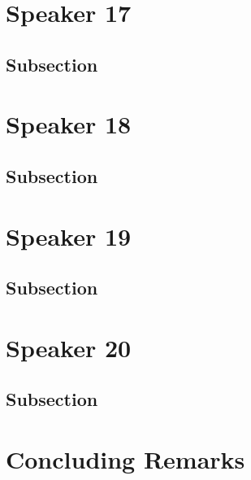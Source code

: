 \documentclass[
]{book}
\begin{document}
\hypertarget{speaker-17}{%
\chapter*{Speaker 17}\label{speaker-17}}

\hypertarget{subsection}{%
\section{Subsection}\label{subsection}}

\hypertarget{speaker-18}{%
\chapter*{Speaker 18}\label{speaker-18}}

\hypertarget{subsection}{%
\section{Subsection}\label{subsection}}

\hypertarget{speaker-19}{%
\chapter*{Speaker 19}\label{speaker-19}}

\hypertarget{subsection}{%
\section{Subsection}\label{subsection}}

\hypertarget{speaker-20}{%
\chapter*{Speaker 20}\label{speaker-20}}

\hypertarget{subsection}{%
\section{Subsection}\label{subsection}}

\hypertarget{concluding-remarks}{%
\chapter*{Concluding Remarks}\label{concluding-remarks}}
\end{document}
